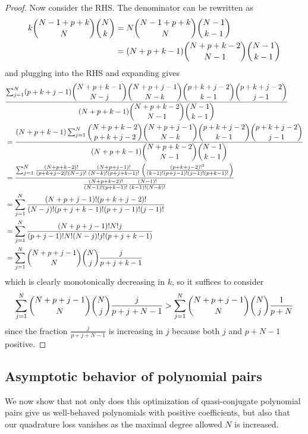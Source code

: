 \documentclass{article}
\theoremstyle{definition}
\theoremstyle{remark}
\numberwithin{equation}{section}
\begin{document}
\begin{proof}
Now consider the RHS. The denominator can be rewritten as 
\begin{align*} 
k \dbinom{N-1+p+k}{N}\dbinom{N}{k} &= N \dbinom{N-1+p+k}{N}\dbinom{N-1}{k-1} \\ 
&= (N+p+k-1) \dbinom{N+p+k-2}{N-1} \dbinom{N-1}{k-1} 
\end{align*} and plugging into the RHS and expanding gives 
\begin{align*}
&\frac{\sum_{j=1}^N (p+k+j-1) \dbinom{N+p+k-1}{N-j} \dbinom{N+p+j-1}{N-k} \dbinom{p+k+j-2}{k-1} \dbinom{p+k+j-2}{j-1} }{ (N+p+k-1) \dbinom{N+p+k-2}{N-1} \dbinom{N-1}{k-1} }  \\
&= \frac{ (N+p+k-1)\sum_{j=1}^N  \dbinom{N+p+k-2}{p+k+j-2} \dbinom{N+p+j-1}{N-k} \dbinom{p+k+j-2}{k-1} \dbinom{p+k+j-2}{j-1} }{ (N+p+k-1) \dbinom{N+p+k-2}{N-1} \dbinom{N-1}{k-1} }  \\
&= \frac{\sum_{j=1}^N \frac{(N+p+k-2)!}{(p+k+j-2)!(N-j)!} \frac{(N+p+j-1)!}{(N-k)! (p+j+k-1)!} \left(\frac{(p+k+j-2)!^2}{(k-1)! (p+j-1)!(j-1)!(p+k-1)!}\right)}{\frac{(N+p+k-2)!}{(N-1)! (p+k-1)!} \frac{(N-1)!}{(k-1)! (N-k)!}}
\\
&= \sum_{j=1}^N \frac{(N+p+j-1)! (p+k+j-2)!}{(N-j)!(p+j+k-1)!(p+j-1)!(j-1)!}\\
&= \sum_{j=1}^N \frac{(N+p+j-1)!N! j}{(p+j-1)!N!(N-j)!j! (p+j+k-1)}\\
&= \sum_{j=1}^N \dbinom{N+p+j-1}{N} \dbinom{N}{j} \frac{j}{p+j+k-1}
\end{align*} which is clearly monotonically decreasing in $k$, so it suffices to consider 
\begin{align*}
\sum_{j=1}^N \dbinom{N+p+j-1}{N} \dbinom{N}{j} \frac{j}{p+j+N-1} > \sum_{j=1}^N \dbinom{N+p+j-1}{N} \dbinom{N}{j}\frac{1}{p+N}
\end{align*} since the fraction $\frac{j}{p+j+N-1}$ is increasing in $j$ because both $j$ and $p+N-1$ positive.
\end{proof}


\subsection{Asymptotic behavior of polynomial pairs}
We now show that not only does this optimization of quasi-conjugate polynomial pairs give us well-behaved polynomials with positive coefficients, but also that our quadrature loss vanishes as the maximal degree allowed $N$ is increased. 
\end{document}

